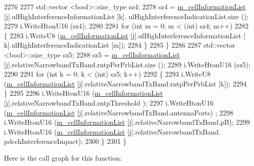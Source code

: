\begin{DoxyCode}
2276 
2277           std::vector <bool>::size\_type sz4;
2278           sz4 = \hyperlink{classns3_1_1EpcX2LoadInformationHeader_aa998b331b688518c15219cb752eefb16}{m\_cellInformationList} [j].ulHighInterferenceInformationList [k].
      ulHighInterferenceIndicationList.size ();
2279           i.WriteHtonU16 (sz4);
2280 
2281           \textcolor{keywordflow}{for} (\textcolor{keywordtype}{int} m = 0; m < (int) sz4; m++)
2282             \{
2283               i.WriteU8 (\hyperlink{classns3_1_1EpcX2LoadInformationHeader_aa998b331b688518c15219cb752eefb16}{m\_cellInformationList} [j].ulHighInterferenceInformationList [
      k].ulHighInterferenceIndicationList [m]);
2284             \}
2285         \}
2286 
2287       std::vector <bool>::size\_type sz5;
2288       sz5 = \hyperlink{classns3_1_1EpcX2LoadInformationHeader_aa998b331b688518c15219cb752eefb16}{m\_cellInformationList} [j].relativeNarrowbandTxBand.rntpPerPrbList.size ();
2289       i.WriteHtonU16 (sz5);
2290 
2291       \textcolor{keywordflow}{for} (\textcolor{keywordtype}{int} k = 0; k < (int) sz5; k++)
2292         \{
2293           i.WriteU8 (\hyperlink{classns3_1_1EpcX2LoadInformationHeader_aa998b331b688518c15219cb752eefb16}{m\_cellInformationList} [j].relativeNarrowbandTxBand.rntpPerPrbList
       [k]);
2294         \}
2295 
2296       i.WriteHtonU16 (\hyperlink{classns3_1_1EpcX2LoadInformationHeader_aa998b331b688518c15219cb752eefb16}{m\_cellInformationList} [j].relativeNarrowbandTxBand.rntpThreshold
      );
2297       i.WriteHtonU16 (\hyperlink{classns3_1_1EpcX2LoadInformationHeader_aa998b331b688518c15219cb752eefb16}{m\_cellInformationList} [j].relativeNarrowbandTxBand.antennaPorts)
      ;
2298       i.WriteHtonU16 (\hyperlink{classns3_1_1EpcX2LoadInformationHeader_aa998b331b688518c15219cb752eefb16}{m\_cellInformationList} [j].relativeNarrowbandTxBand.pB);
2299       i.WriteHtonU16 (\hyperlink{classns3_1_1EpcX2LoadInformationHeader_aa998b331b688518c15219cb752eefb16}{m\_cellInformationList} [j].relativeNarrowbandTxBand.
      pdcchInterferenceImpact);
2300     \}
2301 \}
\end{DoxyCode}


Here is the call graph for this function\+:


